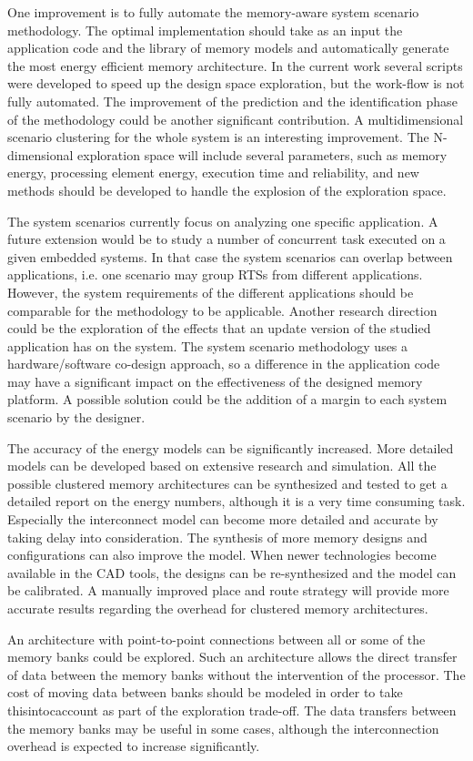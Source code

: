 One improvement is to fully automate the memory-aware system scenario methodology.
The optimal implementation should take as an input the application code and the library of memory models and automatically generate the most energy efficient memory architecture.
In the current work several scripts were developed to speed up the design space exploration, but the work-flow is not fully automated.
The improvement of the prediction and the identification phase of the methodology could be another significant contribution. 
A multidimensional scenario clustering for the whole system is an interesting improvement.
The N-dimensional exploration space will include several parameters, such as memory energy, processing element energy, execution time and reliability, and new methods should be developed to handle the explosion of the exploration space.

The system scenarios currently focus on analyzing one specific application.
A future extension would be to study a number of concurrent task executed on a given embedded systems.
In that case the system scenarios can overlap between applications, i.e. one scenario may group RTSs from different applications.
However, the system requirements of the different applications should be comparable for the methodology to be applicable.
Another research direction could be the exploration of the effects that an update version of the studied application has on the system.
The system scenario methodology uses a hardware/software co-design approach, so a difference in the application code may have a significant impact on the effectiveness of the designed memory platform. 
A possible solution could be the addition of a margin to each system scenario by the designer.

The accuracy of the energy models can be significantly increased.
More detailed models can be developed based on extensive research and simulation.
All the possible clustered memory architectures can be synthesized and tested to get a detailed report on the energy numbers, although it is a very time consuming task.
Especially the interconnect model can become more detailed and accurate by taking delay into consideration.
The synthesis of more memory designs and configurations can also improve the model.
When newer technologies become available in the CAD tools, the designs can be re-synthesized and the model can be calibrated.
A manually improved place and route strategy will provide more accurate results regarding the overhead for clustered memory architectures.

An architecture with point-to-point connections between all or some of the memory banks could be explored. 
Such an architecture allows the direct transfer of data between the memory banks without the intervention of the processor.
The cost of moving data between banks should be modeled
in order to take thisintocaccount as part of the exploration trade-off.
The data transfers between the memory banks may be useful in some cases, although the interconnection overhead is expected to increase significantly.


%
%
